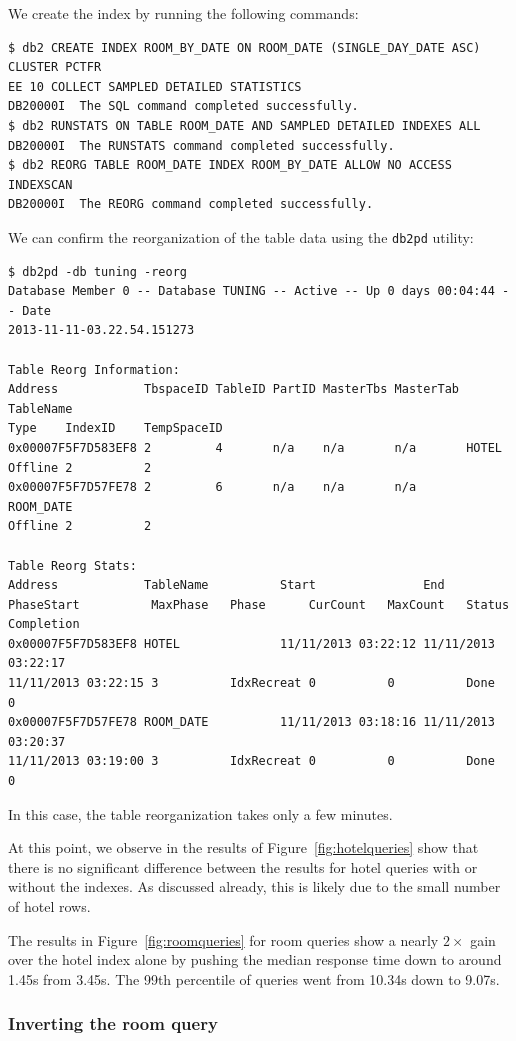 \documentclass[letterpaper]{article}%
\begin{document}
We create the index by running the following commands:
\begin{Verbatim}[frame=single]
$ db2 CREATE INDEX ROOM_BY_DATE ON ROOM_DATE (SINGLE_DAY_DATE ASC) CLUSTER PCTFR
EE 10 COLLECT SAMPLED DETAILED STATISTICS
DB20000I  The SQL command completed successfully.
$ db2 RUNSTATS ON TABLE ROOM_DATE AND SAMPLED DETAILED INDEXES ALL
DB20000I  The RUNSTATS command completed successfully.
$ db2 REORG TABLE ROOM_DATE INDEX ROOM_BY_DATE ALLOW NO ACCESS INDEXSCAN
DB20000I  The REORG command completed successfully.
\end{Verbatim}
We can confirm the reorganization of the table data using the \texttt{db2pd}
utility:
\begin{Verbatim}[frame=single]
$ db2pd -db tuning -reorg
Database Member 0 -- Database TUNING -- Active -- Up 0 days 00:04:44 -- Date
2013-11-11-03.22.54.151273

Table Reorg Information:
Address            TbspaceID TableID PartID MasterTbs MasterTab TableName
Type    IndexID    TempSpaceID
0x00007F5F7D583EF8 2         4       n/a    n/a       n/a       HOTEL
Offline 2          2
0x00007F5F7D57FE78 2         6       n/a    n/a       n/a       ROOM_DATE
Offline 2          2

Table Reorg Stats:
Address            TableName          Start               End
PhaseStart          MaxPhase   Phase      CurCount   MaxCount   Status
Completion
0x00007F5F7D583EF8 HOTEL              11/11/2013 03:22:12 11/11/2013 03:22:17
11/11/2013 03:22:15 3          IdxRecreat 0          0          Done    0
0x00007F5F7D57FE78 ROOM_DATE          11/11/2013 03:18:16 11/11/2013 03:20:37
11/11/2013 03:19:00 3          IdxRecreat 0          0          Done    0
\end{Verbatim}
In this case, the table reorganization takes only a few minutes.

At this point, we observe in the results of Figure~\ref{fig:hotelqueries} show
that there is no significant difference between the results for hotel queries
with or without the indexes. As discussed already, this is likely due to the
small number of hotel rows.

The results in Figure~\ref{fig:roomqueries} for room queries show a nearly
$2\times$ gain over the hotel index alone by pushing the median response time
down to around 1.45s from 3.45s. The 99th percentile of queries went from
10.34s down to 9.07s.

\subsubsection{Inverting the room query}
\end{document}
